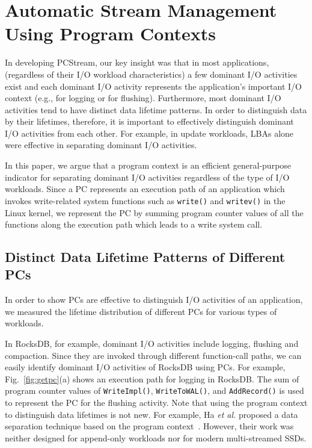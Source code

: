 \section{Automatic Stream Management Using Program Contexts}

In developing \textsf{\small PCStream}, our key insight was that in most applications,
(regardless of their I/O workload characteristics)
a few dominant I/O activities exist
and each dominant I/O activity   
represents the application's important I/O context (e.g., for logging or for flushing). 
Furthermore, most dominant I/O activities tend to have distinct data lifetime patterns.
In order to distinguish data by their lifetimes, therefore, 
it is important to effectively distinguish dominant I/O activities from each other.  
For example, in update workloads, 
LBAs alone were effective in separating dominant I/O activities.  

In this paper, we argue that a program context is an efficient general-purpose
indicator for separating dominant I/O activities regardless of the type of I/O
workloads.  Since a PC represents an execution path of an application which
invokes write-related system functions such as {\tt write()} and {\tt writev()}
in the Linux kernel,  we represent the PC by summing program counter values of
all the functions along the execution path which leads to a write system call.

\subsection{Distinct Data Lifetime Patterns of Different PCs}
In order to show PCs are effective to distinguish I/O activities of
an application, we measured the lifetime distribution of different PCs for various
types of workloads.

In RocksDB, for example, dominant I/O activities include logging, flushing and
compaction.  Since they are invoked through different function-call paths, we
can easily identify dominant I/O activities of RocksDB using PCs.  For example,
Fig.~\ref{fig:getpc}(a) shows an execution path for logging in RocksDB.  The
sum of program counter values of \texttt{WriteImpl()}, \texttt{WriteToWAL()},
and \texttt{AddRecord()} is used to represent the PC for the flushing
activity. Note that using the program context to distinguish data lifetimes is
not new. For example, Ha {\it et al.} proposed a data separation technique
based on the program context~\cite{PCHa}.  However, their work was neither
designed for append-only workloads nor for modern multi-streamed SSDs.

